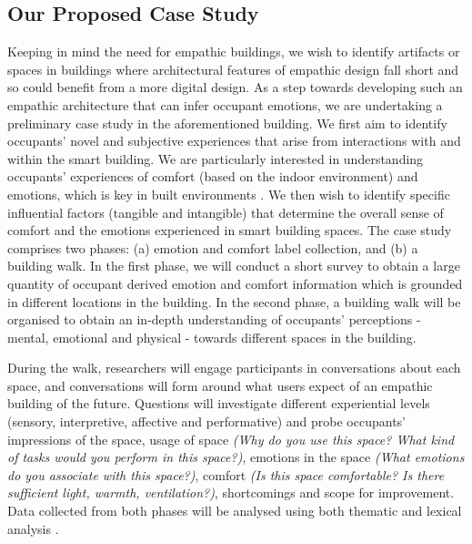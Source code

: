 \documentclass [sigconf, review, anonymous] {acmart}
\begin{document}
\subsection{Our Proposed Case Study} 
Keeping in mind the need for empathic buildings, we wish to identify artifacts or spaces in buildings where architectural features of empathic design fall short and so could benefit from a more digital design. As a step towards developing such an empathic architecture that can infer occupant emotions, we are undertaking a preliminary case study in the aforementioned building. We first aim to identify occupants' novel and subjective experiences that arise from interactions with and within the smart building. We are particularly interested in understanding occupants' experiences of comfort (based on the indoor environment) and emotions, which is key in built environments \cite{alavi2017comfort}.  We then wish to identify specific influential factors (tangible and intangible) that determine the overall sense of comfort and the emotions experienced in smart building spaces. The case study comprises two phases: (a) emotion and comfort label collection, and (b) a building walk. In the first phase, we will conduct a short survey to obtain a large quantity of occupant derived emotion and comfort information which is grounded in different locations in the building. In the second phase, a building walk will be organised to obtain an in-depth understanding of occupants' perceptions - mental, emotional and physical - towards different spaces in the building.

During the walk, researchers will engage participants in conversations about each space, and conversations will form around what users expect of an empathic building of the future. Questions will investigate different experiential levels (sensory, interpretive, affective and performative) and probe occupants' impressions of the space, usage of space \textit{(Why do you use this space? What kind of tasks would you perform in this space?)}, emotions in the space \textit{(What emotions do you associate with this space?)}, comfort \textit{(Is this space comfortable? Is there sufficient light, warmth, ventilation?)}, shortcomings and scope for improvement. Data collected from both phases will be analysed using both thematic and lexical analysis \cite{braun2006using, xue2020mood}. 
\end{document}
